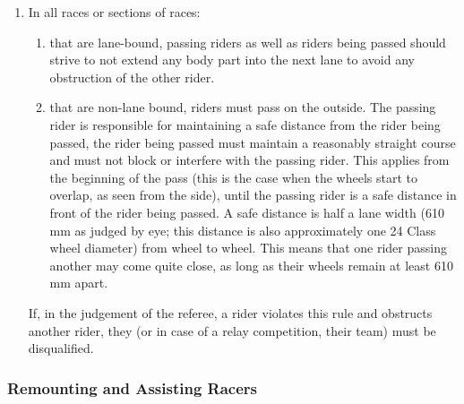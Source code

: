 \begin{enumerate}[leftmargin=1.5em,labelsep=*]
	\item In all races or sections of races:
	
	\begin{enumerate}[label*=\arabic*,leftmargin=1.5em,labelsep=*]
		\item that are lane-bound, passing riders as well as riders being passed should strive to not extend any 
    body part into the next lane to avoid any obstruction of the other rider.
		
		\item that are non-lane bound, riders must pass on the outside.
		The passing rider is responsible for maintaining a safe distance from the rider being passed, 
    the rider being passed must maintain a reasonably straight course and must not block or 
    interfere with the passing rider.
		This applies from the beginning of the pass (this is the case when the wheels start to overlap, as seen from the side), 
    until the passing rider is a safe distance in front of the rider being passed.
		A safe distance is half a lane width (610 mm as judged by eye; this distance is also approximately one 24 Class wheel diameter) 
    from wheel to wheel.
		This means that one rider passing another may come quite close, as long as their wheels remain at least 610 mm apart.
	\end{enumerate}
	
	If, in the judgement of the referee, a rider violates this rule and obstructs another rider, they 
  (or in case of a relay competition, their team) must be disqualified.
\end{enumerate}

\subsubsection{Remounting and Assisting Racers}


